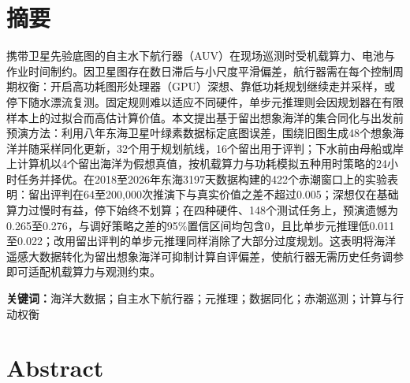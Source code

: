\section*{摘\quad 要}

携带卫星先验底图的自主水下航行器（AUV）在现场巡测时受机载算力、电池与作业时间制约。因卫星图存在数日滞后与小尺度平滑偏差，航行器需在每个控制周期权衡：开启高功耗图形处理器（GPU）深想、靠低功耗规划继续走并采样，或停下随水漂流复测。固定规则难以适应不同硬件，单步元推理则会因规划器在有限样本上的过拟合而高估计算价值。本文提出基于留出想象海洋的集合同化与出发前预演方法：利用八年东海卫星叶绿素数据标定底图误差，围绕旧图生成48个想象海洋并随采样同化更新，32个用于规划航线，16个留出用于评判；下水前由母船或岸上计算机以4个留出海洋为假想真值，按机载算力与功耗模拟五种用时策略的24小时任务并择优。在2018至2026年东海3197天数据构建的422个赤潮窗口上的实验表明：留出评判在64至200,000次推演下与真实价值之差不超过0.005；深想仅在基础算力过慢时有益，停下始终不划算；在四种硬件、148个测试任务上，预演遗憾为0.265至0.276，与调好策略之差的95\%置信区间均包含0，且比单步元推理低0.011至0.022；改用留出评判的单步元推理同样消除了大部分过度规划。这表明将海洋遥感大数据转化为留出想象海洋可抑制计算自评偏差，使航行器无需历史任务调参即可适配机载算力与观测约束。

\vspace{1em}
\noindent\textbf{关键词：}海洋大数据；自主水下航行器；元推理；数据同化；赤潮巡测；计算与行动权衡

\clearpage
\section*{Abstract}

